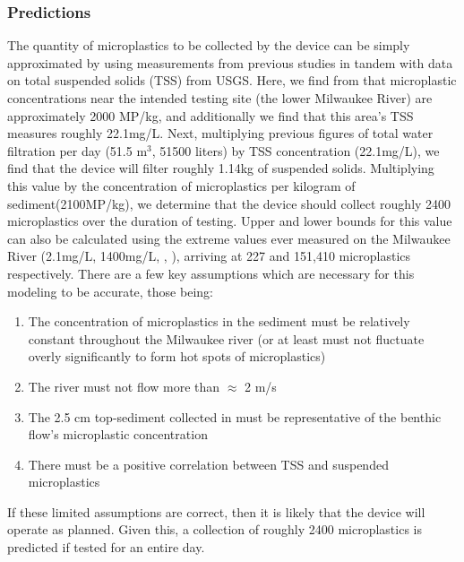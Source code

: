 \documentclass[fleqn,10pt]{SelfArx} %
\begin{document}
	\subsubsection{Predictions}
	\label{subsubsec:predictions}
	The quantity of microplastics to be collected by the device can be simply approximated by using measurements from previous studies in tandem with data on total suspended solids (TSS) from USGS. Here, we find from \cite{LenakerEtAlvertdist} that microplastic concentrations near the intended testing site (the lower Milwaukee River) are approximately 2000 MP/kg, and additionally we find that this area's TSS measures roughly 22.1mg/L. Next, multiplying previous figures of total water filtration per day (51.5 m$^3$, 51500 liters) by TSS concentration (22.1mg/L), we find that the device will filter roughly 1.14kg of suspended solids. Multiplying this value by the concentration of microplastics per kilogram of sediment(2100MP/kg), we determine that the device should collect roughly 2400 microplastics over the duration of testing. Upper and lower bounds for this value can also be calculated using the extreme values ever measured on the Milwaukee River (2.1mg/L, 1400mg/L, \cite{USGSMil}, \cite{MKETSS}), arriving at 227 and 151,410 microplastics respectively. 
	\linebreak
	There are a few key assumptions which are necessary for this modeling to be accurate, those being:
	\begin{enumerate}
		\item The concentration of microplastics in the sediment must be relatively constant throughout the Milwaukee river (or at least must not fluctuate overly significantly to form hot spots of microplastics)
		\item The river must not flow more than $\approx$ 2 m/s
		\item The 2.5 cm top-sediment collected in \cite{LenakerEtAlvertdist} must be representative of the benthic flow's microplastic concentration
		\item There must be a positive correlation between TSS and suspended microplastics
	\end{enumerate}
	If these limited assumptions are correct, then it is likely that the device will operate as planned. Given this, a collection of roughly 2400 microplastics is predicted if tested for an entire day.
	
\end{document}

